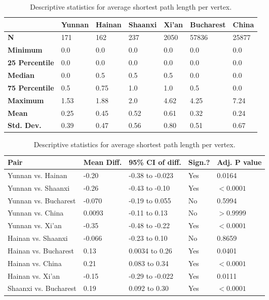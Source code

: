 \begin{table}[htbp]
	\begin{mdframed}
		\begin{tabular*}{\linewidth}{l|llllll}
			\hline
			\textbf{ } & \textbf{Yunnan} & \textbf{Hainan} & \textbf{Shaanxi} & \textbf{Xi'an} & \textbf{Bucharest} & \textbf{China}\\
			\hline
			\textbf{N} & 171 & 162 & 237 & 2050 & 57836 & 25877\\
			\textbf{Minimum} & 0.0 & 0.0 & 0.0 & 0.0 & 0.0 & 0.0\\
			\textbf{25 Percentile} & 0.0 & 0.0 & 0.0 & 0.0 & 0.0 & 0.0\\
			\textbf{Median} & 0.0 & 0.5 & 0.5 & 0.5 & 0.0 & 0.0\\
			\textbf{75 Percentile} & 0.5 & 0.75 & 1.0 & 1.0 & 0.5 & 0.0\\
			\textbf{Maximum} & 1.53 & 1.88 & 2.0 & 4.62 & 4.25 & 7.24\\
			\textbf{Mean} & 0.25 & 0.45 & 0.52 & 0.61 & 0.32 & 0.24\\
			\textbf{Std. Dev.} & 0.39 & 0.47 & 0.56 & 0.80 & 0.51 & 0.67\\
			\hline
		\end{tabular*}
		\caption{Descriptive statistics for average shortest path length per vertex.}
		\label{tab:avg_shortest_path_desc}
		\vskip 10pt
		\small
		\begin{tabular*}{\linewidth}{l|llll}
			\hline
			\textbf{Pair} & \textbf{Mean Diff.} & \textbf{95\% CI of diff.} & \textbf{Sign.?} & \textbf{Adj. P value}\\
			\hline
			Yunnan vs. Hainan & -0.20 & -0.38 to -0.023 & Yes & 0.0164\\
			Yunnan vs. Shaanxi & -0.26 & -0.43 to -0.10 & Yes & $<0.0001$\\
			Yunnan vs. Bucharest & -0.070 & -0.19 to 0.055 & No & 0.5994\\
			Yunnan vs. China & 0.0093 & -0.11 to 0.13 & No & $>0.9999$\\
			Yunnan vs. Xi'an & -0.35 & -0.48 to -0.22 & Yes & $<0.0001$\\
			Hainan vs. Shaanxi & -0.066 & -0.23 to 0.10 & No & 0.8659\\
			Hainan vs. Bucharest & 0.13 & 0.0034 to 0.26 & Yes & 0.0401\\
			Hainan vs. China & 0.21 & 0.083 to 0.34 & Yes & $<0.0001$\\
			Hainan vs. Xi'an & -0.15 & -0.29 to -0.022 & Yes & 0.0111\\
			Shaanxi vs. Bucharest & 0.19 & 0.092 to 0.30 & Yes & $<0.0001$\\

\end{tabular*}
\end{mdframed}
\end{table}
